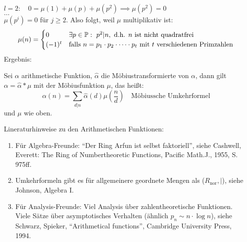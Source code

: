 \documentclass[a4paper,DIV15,BCOR12mm]{article}
\begin{document}
$l=2:\quad 0=\mu(1)+\mu(p)+\mu(p^2) \implies \mu(p^2)=0$\\
$\dotsc$\\
$\mu(p^i)=0$ für $j\geq 2$. Also folgt, weil $\mu$ multiplikativ
ist:
$$ \mu(n)=\begin{cases}0 & \exists p\in\mathbb{P}:\ p^2|n, \text{ d.h. $n$
ist nicht quadratfrei}\\(-1)^t & \text{falls $n=p_1\cdot p_2\cdot
\dotsb \cdot p_t$ mit $t$ verschiedenen Primzahlen}
\end{cases}$$
Ergebnis:
\begin{satz}
    Sei $\alpha$ arithmetische Funktion, $\hat{\alpha}$ die
    Möbiustransformierte von $\alpha$, dann gilt $\alpha=\hat{\alpha}*\mu$ mit
    der Möbiusfunktion $\mu$, das heißt:
    $$\alpha(n)=\sum_{d|n}\hat\alpha(d)\mu\left(\frac{n}{d}\right)\quad
    \text{Möbiussche Umkehrformel}$$ und $\mu$ wie oben.
\end{satz}


Lineraturhinweise zu den Arithmetischen Funktionen:
\begin{enumerate}
\item Für Algebra-Freunde: "`Der Ring Arfun ist selbst faktoriell"', siehe Cashwell, Everett: The Ring of Numbertheoretic Functions, Pacific Math.J., 1955, S. 975ff.
\item Umkehrformeln gibt es für allgemeinere geordnete Mengen als ($R_\text{nor}, |$), siehe Johnson, Algebra I.
\item Für Analysis-Freunde: Viel Analysis über zahlentheoretische Funktionen. Viele Sätze über asymptotisches Verhalten (ähnlich $p_n \sim n\cdot\log n$), siehe Schwarz, Spieker, "`Arithmetical functions"', Cambridge University Press, 1994.
\end{enumerate}
\end{document}
